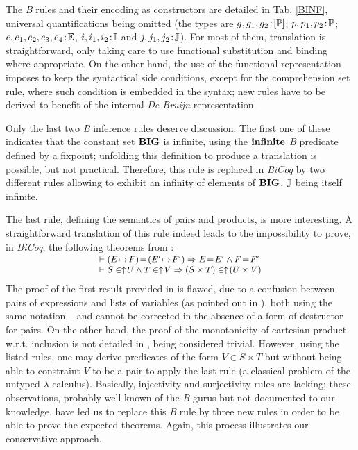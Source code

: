 \documentclass{llncs}
\begin{document}
The \emph{B} rules and their encoding as constructors are detailed in Tab.
\ref{BINF}, universal quantifications being omitted (the types are $g,g_1,g_2\!:\![\mathbb{P}]$; 
$p,p_1,p_2\!:\!\mathbb{P}$; $e,e_1,e_2,e_3,e_4\!:\!\mathbb{E}$, $i,i_1,i_2\!:\!\mathbb{I}$ and 
$j,j_1,j_2\!:\!\mathbb{J}$). For most of them, translation is straightforward, only taking care to 
use functional substitution and binding where appropriate. On the other hand, the use of the 
functional representation imposes to keep the syntactical side conditions, except for the 
comprehension set rule, where such condition is embedded in the syntax; new rules have to be 
derived to benefit of the internal \emph{De Bruijn} representation.

Only the last two \emph{B} inference rules deserve discussion. The first one of these
indicates that the constant set $\mathbf{BIG}$ is infinite, using the $\mathbf{infinite}$ 
\emph{B} predicate defined by a fixpoint; unfolding this definition to produce a translation is
possible, but not practical. Therefore, this rule is replaced in \emph{BiCoq} by two different 
rules allowing to exhibit an infinity of elements of $\mathbf{BIG}$, $\mathbb{J}$ being itself 
infinite.

The last rule, defining the semantics of pairs and products, is more interesting. A 
straightforward translation of this rule indeed leads to the impossibility to prove, in 
\emph{BiCoq}, the following theorems from \cite{abr:1}:
\[
\small
\begin{array}{l}
\vspace{-16pt}\\
\vdash (E\!\mapsto\!F)\!=\!(E'\!\mapsto\!F') \Rightarrow E\!=\!E' \land F\!=\!F'\\
\vdash S\in\uparrow\!U \land T\in\uparrow\!V\Rightarrow(S \times T)\in\uparrow\!(U \times V)\\
\end{array}
\]
The proof of the first result provided in \cite{abr:1} is flawed, due to a confusion between 
pairs of expressions and lists of variables (as pointed out in \cite{mus:1}), both using the 
same notation -- and cannot be corrected in the absence of a form of destructor for pairs. On 
the other hand, the proof of the monotonicity of cartesian product w.r.t. inclusion is not 
detailed in \cite{abr:1}, being considered trivial. However, using the listed rules, one may 
derive predicates of the form $V\!\in\!S\!\times\!T$ but without being able to constraint $V$ 
to be a pair to apply the last rule (a classical problem of the untyped $\lambda$-calculus). 
Basically, injectivity and surjectivity rules are lacking; these observations, probably well 
known of the \emph{B} gurus but not documented to our knowledge, have led us to replace this 
\emph{B} rule by three new rules in order to be able to prove the expected theorems. Again, 
this process illustrates our conservative approach.
\end{document}
